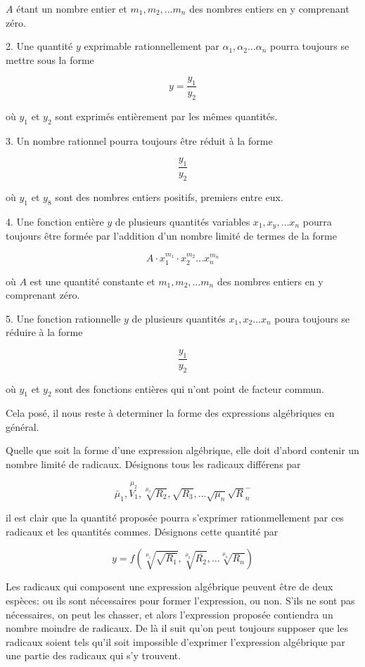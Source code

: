 \documentclass{article}
\begin{document}
\(A\) étant un nombre entier et \(m_{1}, m_{2}, \ldots m_{n}\) des nombres entiers en y comprenant zéro.

2. Une quantité \(y\) exprimable rationnellement par \(\alpha_{1}, \alpha_{2} \ldots \alpha_{n}\) pourra toujours se mettre sous la forme

\[
y=\frac{y_{1}}{y_{2}}
\]

où \(y_{1}\) et \(y_{2}\) sont exprimés entièrement par les mêmes quantités.

3. Un nombre rationnel pourra toujours être réduit à la forme

\[
\frac{y_{1}}{y_{2}}
\]

où \(y_{1}\) et \(y_{8}\) sont des nombres entiers positifs, premiers entre eux.

4. Une fonction entière \(y\) de plusieurs quantités variables \(x_{1}, x_{y}, \ldots x_{n}\) pourra toujours être formée par l'addition d'un nombre limité de termes de la forme

\[
A \cdot x_{1}^{m_{1}} \cdot x_{2}^{m_{2}} \ldots x_{n}^{m_{n}}
\]

où \(A\) est une quantité constante et \(m_{1}, m_{2}, \ldots m_{n}\) des nombres entiers en y comprenant zéro.

5. Une fonction rationnelle \(y\) de plusieurs quantités \(x_{1}, x_{2} \ldots x_{n}\) poura toujours se réduire à la forme

\[
\frac{y_{1}}{y_{2}}
\]

où \(y_{1}\) et \(y_{2}\) sont des fonctions entières qui n'ont point de facteur commun.

Cela posé, il nous reste à determiner la forme des expressions algébriques en général.

Quelle que soit la forme d'une expression algébrique, elle doit d'abord contenir un nombre limité de radicaux. Désignons tous les radicaux différens par

\[
\bar{\mu}_{1}, \stackrel{\mu_{2}}{V_{1}}, \sqrt[\mu_{3}]{R_{2}}, \sqrt{R_{3}}, \ldots \sqrt{\mu_{n}} \sqrt{R}_{n}^{-}
\]

il est clair que la quantité proposée pourra s'exprimer rationmellement par ces radicaux et les quantités commes. Désignons cette quantité par

\[
y=f\left(\sqrt[\mu_{1}]{\sqrt{R_{1}}}, \sqrt[\mu_{2}]{\overline{R_{2}}}, \ldots \sqrt[\mu_{n}]{R_{n}}\right)
\]

Les radicaux qui composent une expression algébrique peuvent être de deux espèces: ou ils sont nécessaires pour former l'expression, ou non. S'ils ne sont pas nécessaires, on peut les chasser, et alors l'expression proposée contiendra un nombre moindre de radicaux. De là il suit qu'on peut toujours
supposer que les radicaux soient tels qu'il soit impossible d'exprimer l'expression algébrique par une partie des radicaux qui s'y trouvent.
\end{document}
